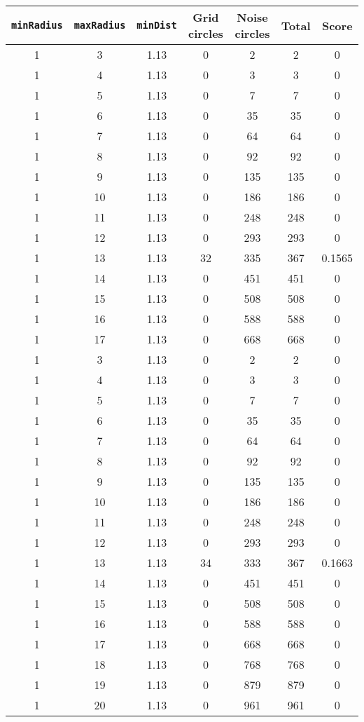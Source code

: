 \documentclass[letterpaper, 12pt]{article}
\begin{document}
\begin{longtable}{|c|c|c|c|c|c|c|}
\hline
\textbf{\texttt{minRadius}} & \textbf{\texttt{maxRadius}} & \textbf{\texttt{minDist}} & \textbf{Grid circles} & \textbf{Noise circles} & \textbf{Total} & \textbf{Score} \\
\hline
1 & 3 & 1.13 & 0 & 2 & 2 & 0 \\
\hline
1 & 4 & 1.13 & 0 & 3 & 3 & 0 \\
\hline
1 & 5 & 1.13 & 0 & 7 & 7 & 0 \\
\hline
1 & 6 & 1.13 & 0 & 35 & 35 & 0 \\
\hline
1 & 7 & 1.13 & 0 & 64 & 64 & 0 \\
\hline
1 & 8 & 1.13 & 0 & 92 & 92 & 0 \\
\hline
1 & 9 & 1.13 & 0 & 135 & 135 & 0 \\
\hline
1 & 10 & 1.13 & 0 & 186 & 186 & 0 \\
\hline
1 & 11 & 1.13 & 0 & 248 & 248 & 0 \\
\hline
1 & 12 & 1.13 & 0 & 293 & 293 & 0 \\
\hline
1 & 13 & 1.13 & 32 & 335 & 367 & 0.1565 \\
\hline
1 & 14 & 1.13 & 0 & 451 & 451 & 0 \\
\hline
1 & 15 & 1.13 & 0 & 508 & 508 & 0 \\
\hline
1 & 16 & 1.13 & 0 & 588 & 588 & 0 \\
\hline
1 & 17 & 1.13 & 0 & 668 & 668 & 0 \\
\hline
1 & 3 & 1.13 & 0 & 2 & 2 & 0 \\
\hline
1 & 4 & 1.13 & 0 & 3 & 3 & 0 \\
\hline
1 & 5 & 1.13 & 0 & 7 & 7 & 0 \\
\hline
1 & 6 & 1.13 & 0 & 35 & 35 & 0 \\
\hline
1 & 7 & 1.13 & 0 & 64 & 64 & 0 \\
\hline
1 & 8 & 1.13 & 0 & 92 & 92 & 0 \\
\hline
1 & 9 & 1.13 & 0 & 135 & 135 & 0 \\
\hline
1 & 10 & 1.13 & 0 & 186 & 186 & 0 \\
\hline
1 & 11 & 1.13 & 0 & 248 & 248 & 0 \\
\hline
1 & 12 & 1.13 & 0 & 293 & 293 & 0 \\
\hline
1 & 13 & 1.13 & 34 & 333 & 367 & 0.1663 \\
\hline
1 & 14 & 1.13 & 0 & 451 & 451 & 0 \\
\hline
1 & 15 & 1.13 & 0 & 508 & 508 & 0 \\
\hline
1 & 16 & 1.13 & 0 & 588 & 588 & 0 \\
\hline
1 & 17 & 1.13 & 0 & 668 & 668 & 0 \\
\hline
1 & 18 & 1.13 & 0 & 768 & 768 & 0 \\
\hline
1 & 19 & 1.13 & 0 & 879 & 879 & 0 \\
\hline
1 & 20 & 1.13 & 0 & 961 & 961 & 0 \\
\hline
\end{longtable}
\end{document}
